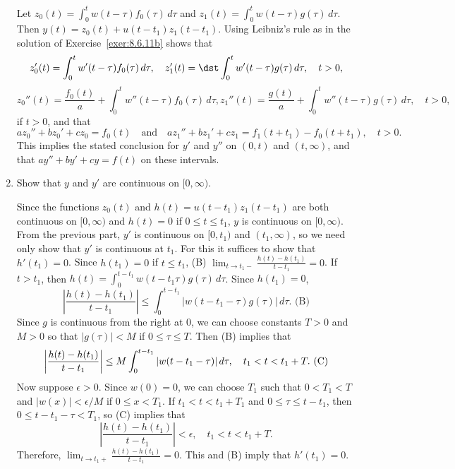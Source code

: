 \documentclass{ximera}
\begin{document}
\begin{problem}
\begin{enumerate}
\begin{solution}
Let $z_0(t)=\int_0^tw(t-\tau)f_0(\tau)\,d\tau$
and $z_1(t)=\int_0^tw(t-\tau)g(\tau)\,d\tau$.
Then $y(t)=z_0(t)+u(t-t_1)z_1(t-t_1)$. Using Leibniz's rule as in the
solution of Exercise~\ref{exer:8.6.11b} shows that
$$
z_0'(t)=\int_0^tw'(t-\tau)f_0(\tau)\,d\tau,\quad
z_1'(t)=\dst\int_0^tw'(t-\tau)g(\tau)\,d\tau,\quad t>0,
$$
$$
z_0''(t)=\frac{f_0(t)}{a}+\int_0^tw''(t-\tau)f_0(\tau)\,d\tau,
z_1''(t)=\frac{g(t)}{a}+\int_0^tw''(t-\tau)g(\tau)\,d\tau,\quad
t>0,
$$
 if $t>0$, and that
$$
az_0''+bz_0'+cz_0=f_0(t)\quad \mbox{and} \quad
az_1''+bz_1'+cz_1=f_1(t+t_1)-f_0(t+t_1),\quad  t>0.
$$
This implies the stated conclusion for $y'$ and $y''$  on $(0,t)$ and
$(t,\infty)$, and that $ay''+by'+cy=f(t)$ on these intervals.
\end{solution}

\item %
Show that $y$ and $y'$ are continuous on $[0,\infty)$.

\begin{solution}
Since  the functions $z_0(t)$ and  $h(t)=u(t-t_1)z_1(t-t_1)$
are both continuous on $[0,\infty)$ and $h(t)=0$ if $0\le t\le t_1$,
$y$ is continuous on $[0,\infty)$. From the previous part, $y'$ is continuous
on $[0,t_1)$ and $(t_1,\infty)$, so we need only show that $y'$
is continuous at $t_1$.
For this it suffices to show  that $h'(t_1)=0$.
 Since $h(t_1)=0$ if $t\le t_1$,
(B) $\lim_{t\to t_1-}\frac{h(t)-h(t_1)}{t-t_1}=0$.
If $t>t_1$, then $h(t)=\int_0^{t-t_1}w(t-t_1\tau)g(\tau)\,d\tau$.
Since $h(t_1)=0$,
$$
\left|\frac{h(t)-h(t_1)}{t-t_1}\right|\le\int_0^{t-t_1}
|w(t-t_1-\tau)g(\tau)|\,d\tau.
\text{ (B)}
$$
 Since $g$ is continuous from the right at
$0$, we can choose constants $T>0$  and $M>0$ so that
$|g(\tau)|<M$ if $0\le \tau\le T$. Then (B) implies that
$$
\left|{h(t)-h(t_1)\over t-t_1}\right|\le M\int_0^{t-t_1}
|w(t-t_1-\tau)|\,d\tau,\quad t_1<t<t_1+T.
\text{ (C)}
$$
Now suppose $\epsilon>0$. Since $w(0)=0$, we can choose $T_1$
such that $0<T_1<T$ and $|w(x)|<\epsilon/M$ if $0\le x<T_1$.
If $t_1<t<t_1+T_1$ and $0\le\tau\le t-t_1$, then $0\le t-t_1-\tau<T_1$,
so (C) implies that
$$
\left|\frac{h(t)-h(t_1)}{t-t_1}\right|< \epsilon,\quad
t_1<t<t_1+T.
$$
Therefore,
 $\lim_{t\to t_1+}\frac{h(t)-h(t_1)}{t-t_1}=0$. This and
(B) imply that $h'(t_1)=0$.

\end{solution}
\end{enumerate}
\end{problem}
\end{document}
